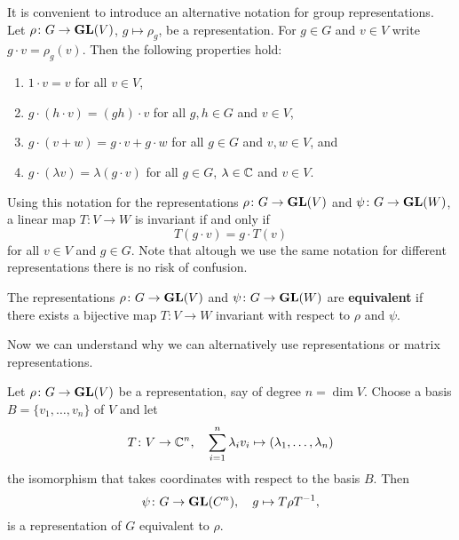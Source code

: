 It is convenient to introduce an alternative
notation for group representations. 
Let $\rho\colon G\to\mathbf{GL}(V)$, $g\mapsto \rho_g$, be a representation. For
$g\in G$ and $v\in V$ write $g\cdot v=\rho_g(v)$. Then the following properties hold: 
\begin{enumerate}
	\item $1\cdot v=v$ for all $v\in V$, 
	\item $g\cdot (h\cdot v)=(gh)\cdot v$ for all $g,h\in G$ and $v\in V$, 
	\item $g\cdot (v+w)=g\cdot v+g\cdot w$ for all $g\in G$ and $v,w\in V$, and 
	\item $g\cdot (\lambda v)=\lambda (g\cdot v)$ for all $g\in G$, $\lambda\in\mathbb{C}$ and $v\in V$.  	
\end{enumerate}
Using this notation for the representations $\rho\colon G\to\mathbf{GL}(V)$ 
and $\psi\colon G\to\mathbf{GL}(W)$, a linear
map $T\colon V\to W$ is invariant if and only if
\[
T(g\cdot v)=g\cdot T(v)
\]
for all $v\in V$ and $g\in G$. Note
that altough we use the same notation for different representations there is no risk of confusion. 

\begin{definition}
    The representations $\rho\colon G\to\mathbf{GL}(V)$ and $\psi\colon G\to\mathbf{GL}(W)$ are \textbf{equivalent}
    if there exists a bijective map $T\colon V\to W$ invariant with respect to $\rho$ and $\psi$.
\end{definition}

Now we can understand why we can alternatively use
representations or matrix representations. 

\begin{example}
\label{xca:change_of_basis}
Let $\rho\colon G\to\mathbf{GL}(V)$ be a representation, say of degree 
$n=\dim V$. Choose a basis 
$B=\{v_1,\dots,v_n\}$ of $V$ and let 
\[
T\colon V\to\mathbb{C}^n,
\quad
\sum_{i=1}^n\lambda_iv_i\mapsto (\lambda_1,\dots,\lambda_n)
\]
the isomorphism that takes coordinates 
with respect to the basis $B$.
Then 
\[
\psi\colon G\to\mathbf{GL}(C^n),
\quad 
g\mapsto T\rho T^{-1},
\]
is a representation of $G$ equivalent to $\rho$.   
\end{example}

